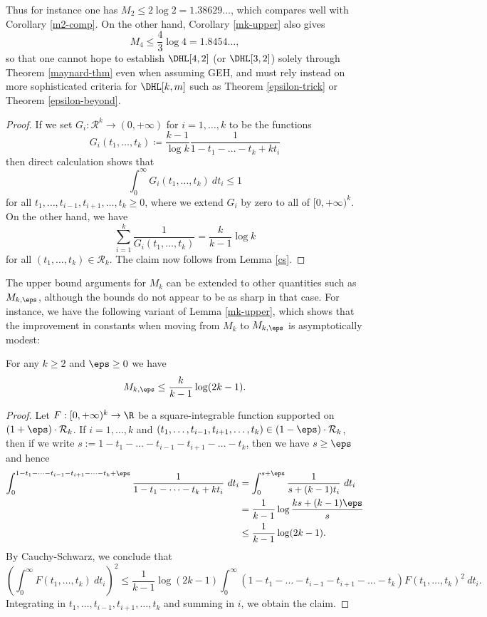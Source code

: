 Thus for instance one has $M_2 \leq 2 \log 2 = 1.38629\dots$, which compares well with Corollary \ref{m2-comp}.  On the other hand, Corollary \ref{mk-upper} also gives
$$ M_4 \leq \frac{4}{3} \log 4 = 1.8454\dots, $$
so that one cannot hope to establish $\DHL[4,2]$ (or $\DHL[3,2]$) solely through Theorem \ref{maynard-thm} even when assuming GEH, and must rely instead on more sophisticated criteria for $\DHL[k,m]$ such as Theorem \ref{epsilon-trick} or Theorem \ref{epsilon-beyond}. 

\begin{proof}  If we set $G_i: {\mathcal R}^k \to (0,+\infty)$ for $i=1,\dots,k$ to be the functions
$$ G_i(t_1,\dots,t_k) \coloneqq \frac{k-1}{\log k} \frac{1}{1-t_1-\dots-t_k + kt_i} $$
then direct calculation shows that
$$ \int_0^\infty G_i(t_1,\dots,t_k)\ dt_i \leq 1$$
for all $t_1,\dots,t_{i-1},t_{i+1},\dots,t_k \geq 0$, where we extend $G_i$ by zero to all of $[0,+\infty)^k$.  On the other hand, we have
$$ \sum_{i=1}^k \frac{1}{G_i(t_1,\dots,t_k)} = \frac{k}{k-1} \log k$$
for all $(t_1,\dots,t_k) \in {\mathcal R}_k$.  The claim now follows from Lemma \ref{cs}.
\end{proof}

The upper bound arguments for $M_k$ can be extended to other quantities such as $M_{k,\eps}$, although the bounds do not appear to be as sharp in that case.  For instance, we have the following variant of Lemma \ref{mk-upper}, which shows that the improvement in constants when moving from $M_k$ to $M_{k,\eps}$ is asymptotically modest:

\begin{proposition}\label{mkeps}  For any $k \geq 2$ and $\eps \geq 0$ we have
$$ M_{k,\eps} \leq \frac{k}{k-1} \log(2k-1).$$
\end{proposition}

\begin{proof}  
Let $F: [0,+\infty)^k \to \R$ be a square-integrable function supported on $(1+\eps) \cdot {\mathcal R}_k$.  If $i=1,\dots,k$ and $(t_1,\dots,t_{i-1},t_{i+1},\dots,t_k) \in (1-\eps) \cdot {\mathcal R}_k$, then if we write $s := 1-t_1-\dots-t_{i-1}-t_{i+1}-\dots-t_k$, then we have $s \geq \eps$ and hence
\begin{align*}
\int_0^{1-t_1-\dots-t_{i-1}-t_{i+1}-\dots-t_k+\eps} \frac{1}{1-t_1-\dots-t_k + kt_i}\ dt_i 
&= \int_0^{s+\eps} \frac{1}{s+(k-1)t_i}\ dt_i \\
&= \frac{1}{k-1} \log \frac{ks + (k-1)\eps}{s} \\
&\leq \frac{1}{k-1} \log(2k-1).
\end{align*}
By Cauchy-Schwarz, we conclude that
$$ \left(\int_0^\infty F(t_1,\dots,t_k)\ dt_i\right)^2 \leq \frac{1}{k-1} \log(2k-1) \int_0^\infty (1-t_1-\dots-t_{i-1}-t_{i+1}-\dots-t_k) F(t_1,\dots,t_k)^2\ dt_i.$$
Integrating in $t_1,\dots,t_{i-1},t_{i+1},\dots,t_k$ and summing in $i$, we obtain the claim.
\end{proof}

